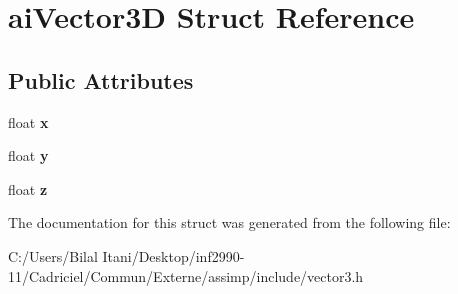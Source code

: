 \hypertarget{structai_vector3_d}{}\section{ai\+Vector3D Struct Reference}
\label{structai_vector3_d}
\subsection*{Public Attributes}
\begin{DoxyCompactItemize}
\item 
float {\bfseries x}\hypertarget{structai_vector3_d_a3762d39eeb99def9ebd413b2bb8dd470}{}\label{structai_vector3_d_a3762d39eeb99def9ebd413b2bb8dd470}

\item 
float {\bfseries y}\hypertarget{structai_vector3_d_ac7b5fcc03324f8c3bc8429c95882dfb8}{}\label{structai_vector3_d_ac7b5fcc03324f8c3bc8429c95882dfb8}

\item 
float {\bfseries z}\hypertarget{structai_vector3_d_a2b93b892064995e8d24f4e3352175aae}{}\label{structai_vector3_d_a2b93b892064995e8d24f4e3352175aae}

\end{DoxyCompactItemize}


The documentation for this struct was generated from the following file\+:\begin{DoxyCompactItemize}
\item 
C\+:/\+Users/\+Bilal Itani/\+Desktop/inf2990-\/11/\+Cadriciel/\+Commun/\+Externe/assimp/include/vector3.\+h\end{DoxyCompactItemize}

